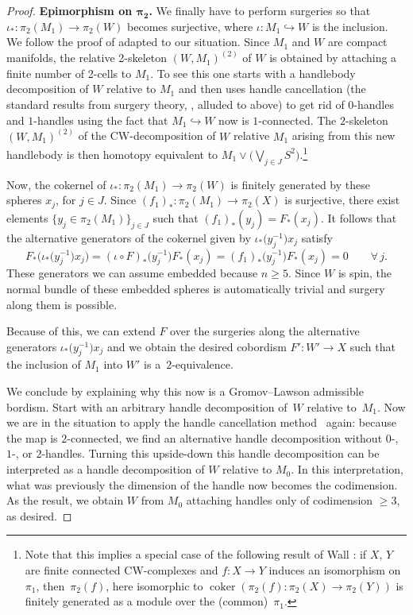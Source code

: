 \documentclass[pdftex]{sigma}
\numberwithin{equation}{section}
\newcommand{\into}{\hookrightarrow}
\DeclareMathOperator{\coker}{coker}
\begin{document}
\begin{proof}
 \textbf{Epimorphism on $\boldsymbol{\pi_2}$.} We finally have to perform surgeries so
 that $\iota_*\colon \pi_2(M_1)\to \pi_2(W)$ becomes surjective, where
 $\iota\colon M_1\into W$ is the inclusion. We follow the proof of \cite[Lemma~5.6]{Stolz} adapted to our situation.
 Since $M_1$ and $W$ are compact manifolds, the relative 2-skeleton
 $(W,M_1)^{(2)}$ of $W$ is obtained by attaching a finite number of 2-cells
 to $M_{1}$. To see this one starts with a handlebody decomposition of $W$
 relative to $M_1$ and then uses handle cancellation (the standard results
 from surgery theory, \cite{Wall}, alluded to above) to get rid of $0$-handles and $1$-handles
 using the fact that $M_1\into W$ now is $1$-connected. The $2$-skeleton
 $(W,M_1)^{(2)}$ of
 the CW-decomposition of $W$ relative $M_1$ arising from this new handlebody
 is then homotopy equivalent to $M_{1}\vee\big(\bigvee_{j\in J}
 S^2\big)$.\footnote{Note that this implies a special case of the following
 result of Wall \cite[proof of Lemma~1.1]{Wall_finite}: if $X$, $Y$ are finite connected
 CW-complexes and $f\colon X\to Y$ induces an isomorphism on $\pi_1$,
 then~$\pi_2(f)$, here isomorphic to $\coker(\pi_2(f)\colon \pi_2(X)\to
 \pi_2(Y))$ is finitely generated as a module over the (common)~$\pi_1$.}

 Now, the cokernel of $\iota_*\colon \pi_2(M_1)\to \pi_2(W)$
 is finitely generated by these spheres $x_j$, for $j\in J$. Since $(f_1)_*\colon \pi_2(M_1)\to \pi_2(X)$ is surjective, there exist
 elements $\{y_j\in \pi_2(M_1)\}_{j\in J}$ such that $(f_1)_*(y_j)=F_*(
 x_j)$. It follows that the alternative generators of the cokernel given by $\iota_*\big(y_j^{-1}\big) x_j$ satisfy
 \[F_*\big(\iota_*\big(y_j^{-1}\big) x_j\big)=(\iota\circ
 F)_*\big(y_j^{-1}\big)F_*(x_j)=(f_1)_*\big(y^{-1}_j\big)F_*(x_j)=0\qquad\forall\, j.\]
 These generators we can
 assume embedded because $n\ge 5$. Since $W$ is spin, the normal
 bundle of these embedded spheres is automatically trivial and surgery
 along them is possible.

Because of this, we can extend $F$ over the surgeries along
 the alternative generators $\iota_*\big(y_j^{-1}\big) x_j$ and we obtain
 the desired cobordism ${F'}\colon W'\to X$ such that the
 inclusion of $M_1$ into $W'$ is a~$2$-equivalence.

 We conclude by explaining why this now is a Gromov--Lawson admissible
 bordism. Start with an arbitrary handle decomposition of~$W$ relative to~$M_1$.
 Now we are in the situation to apply the handle cancellation method~\cite{Wall} again: because the map is $2$-connected, we find an alternative
 handle decomposition without $0$-, $1$-, or $2$-handles. Turning this
 upside-down this handle decomposition can be interpreted as a handle
 decomposition of $W$ relative to $M_0$. In this interpretation, what was
 previously the dimension of the handle now becomes the codimension. As the
 result, we obtain $W$ from $M_0$ attaching handles only of codimension $\ge
 3$, as desired.
\end{proof}
\end{document}
